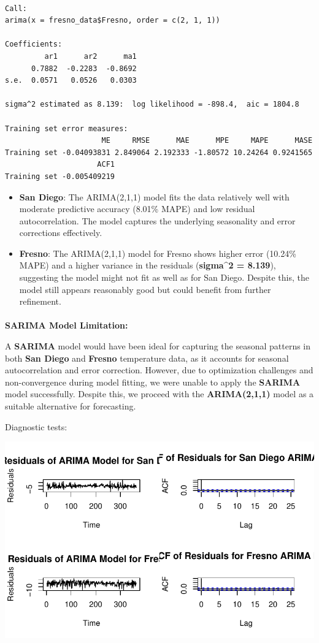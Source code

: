 \documentclass[
  11pt,
]{article}
\makeatletter
\let\oldparagraph\paragraph
\renewcommand{\paragraph}{
    \@ifstar
      \xxxParagraphStar
      \xxxParagraphNoStar
  }
\newcommand{\xxxParagraphStar}[1]{\oldparagraph*{#1}\mbox{}}
\newcommand{\xxxParagraphNoStar}[1]{\oldparagraph{#1}\mbox{}}
\makeatother
\begin{document}
\begin{verbatim}

Call:
arima(x = fresno_data$Fresno, order = c(2, 1, 1))

Coefficients:
         ar1      ar2      ma1
      0.7882  -0.2283  -0.8692
s.e.  0.0571   0.0526   0.0303

sigma^2 estimated as 8.139:  log likelihood = -898.4,  aic = 1804.8

Training set error measures:
                      ME     RMSE      MAE      MPE     MAPE      MASE
Training set -0.04093831 2.849064 2.192333 -1.80572 10.24264 0.9241565
                     ACF1
Training set -0.005409219
\end{verbatim}

\begin{itemize}
\item
  \textbf{San Diego}: The ARIMA(2,1,1) model fits the data relatively
  well with moderate predictive accuracy (8.01\% MAPE) and low residual
  autocorrelation. The model captures the underlying seasonality and
  error corrections effectively.
\item
  \textbf{Fresno}: The ARIMA(2,1,1) model for Fresno shows higher error
  (10.24\% MAPE) and a higher variance in the residuals
  (\textbf{sigma\^{}2 = 8.139}), suggesting the model might not fit as
  well as for San Diego. Despite this, the model still appears
  reasonably good but could benefit from further refinement.
\end{itemize}

\paragraph{\texorpdfstring{\textbf{SARIMA Model
Limitation:}}{SARIMA Model Limitation:}}\label{sarima-model-limitation}

A \textbf{SARIMA} model would have been ideal for capturing the seasonal
patterns in both \textbf{San Diego} and \textbf{Fresno} temperature
data, as it accounts for seasonal autocorrelation and error correction.
However, due to optimization challenges and non-convergence during model
fitting, we were unable to apply the \textbf{SARIMA} model successfully.
Despite this, we proceed with the \textbf{ARIMA(2,1,1)} model as a
suitable alternative for forecasting.

Diagnostic tests:

\includegraphics{project_files/figure-pdf/unnamed-chunk-86-1.pdf}
\end{document}
